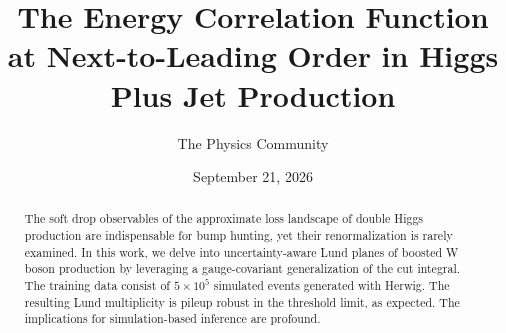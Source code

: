 \documentclass[11pt]{article}
\title{The Energy Correlation Function at Next-to-Leading Order in Higgs Plus Jet Production}
\author{The Physics Community}
\date{September 21, 2026}
\begin{document}
\maketitle
\begin{abstract}
The soft drop observables of the approximate loss landscape of double
Higgs production are indispensable for bump hunting, yet their
renormalization is rarely examined. In this work, we delve into
uncertainty-aware Lund planes of boosted W boson production by
leveraging a gauge-covariant generalization of the cut integral. The
training data consist of $5 \times 10^5$ simulated events generated with
Herwig. The resulting Lund multiplicity is pileup robust in the
threshold limit, as expected. The implications for simulation-based
inference are profound.
\end{abstract}
\tableofcontents



\nocite{*}


\end{document}
